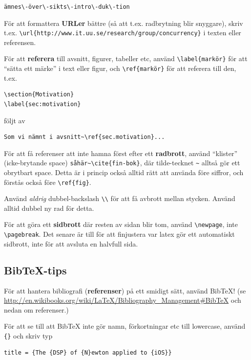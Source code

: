 \documentclass[a4paper,12pt]{article}
\begin{document}
\begin{verbatim}
ämnes\-över\-sikts\-intro\-duk\-tion
\end{verbatim}

För att formattera \textbf{URLer} bättre (så att t.ex. radbrytning blir snyggare), skriv t.ex. \verb|\url{http://www.it.uu.se/research/group/concurrency}| i texten eller referensen.

För att \textbf{referera} till avsnitt, figurer, tabeller etc, använd \verb|\label{markör}| för att ``sätta ett märke'' i text eller figur, och \verb|\ref{markör}| för att referera till den, t.ex.
\begin{verbatim}
\section{Motivation}
\label{sec:motivation}
\end{verbatim}

följt av
\begin{verbatim}
Som vi nämnt i avsnitt~\ref{sec.motivation}...
\end{verbatim}

För att få referenser att inte hamna först efter ett \textbf{radbrott}, använd ``klister'' (icke-brytande space) \verb|såhär~\cite{fin-bok}|, där tilde-tecknet \verb|~| alltså gör ett obrytbart space. Detta är i princip också alltid rätt att använda före siffror, och förstås också före \verb|\ref{fig}|.

Använd \emph{aldrig} dubbel-backslash \verb|\\| för att få avbrott mellan stycken. Använd alltid dubbel ny rad för detta.

För att göra ett \textbf{sidbrott} där resten av sidan blir tom, använd \verb|\newpage|, inte \verb|\pagebreak|. Det senare är till för att finjustera var latex gör ett automatiskt sidbrott, inte för att avsluta en halvfull sida.

\subsection{Bib\TeX-tips}

För att hantera bibliografi (\textbf{referenser}) på ett smidigt sätt, använd BibTeX! (se \url{http://en.wikibooks.org/wiki/LaTeX/Bibliography_Management#BibTeX} och nedan om referenser.)

För att se till att BibTeX inte gör namn, förkortningar etc till lowercase, använd \verb|{}| och skriv typ
\begin{verbatim}
title = {The {DSP} of {N}ewton applied to {iOS}}
\end{verbatim}
\end{document}
